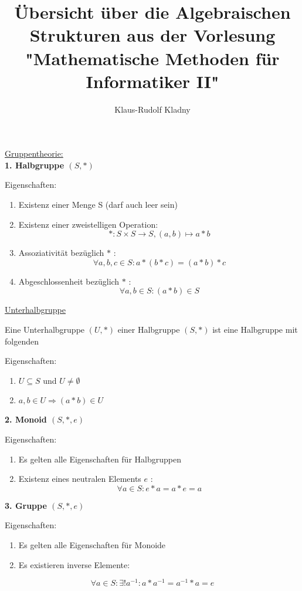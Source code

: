 \documentclass[18pt] {article}
\title{Übersicht über die Algebraischen Strukturen aus der Vorlesung "Mathematische Methoden für Informatiker II"}
\date{\vspace{-4ex}}
\author{Klaus-Rudolf Kladny}
\begin{document}
\maketitle
\vspace{15mm}
\underline{\huge Gruppentheorie:}\\

\textbf{1. Halbgruppe $(S, *)$}
\begin{framed}
Eigenschaften: \\
\begin{enumerate}
\item Existenz einer Menge S (darf auch leer sein)

\item Existenz einer zweistelligen Operation:\\
$$*: S \times S \rightarrow S, (a, b) \mapsto a * b$$

\item Assoziativität bezüglich $*$ :\\
$$\forall a, b, c \in S:   a*(b*c) = (a*b)*c$$

\item Abgeschlossenheit bezüglich $*$ :\\
$$\forall a, b \in S:   (a*b) \in S$$
\end{enumerate}
\end{framed} 
\bigskip
\large{\underline{Unterhalbgruppe}}

Eine Unterhalbgruppe $(U, *)$ einer Halbgruppe $(S, *)$ ist eine Halbgruppe mit folgenden 

Eigenschaften:\\

\begin{enumerate}
\item $U \subseteq S$ und $U \neq \emptyset$

\item $a, b \in U \Rightarrow (a * b) \in U$
\end{enumerate}
\pagebreak
\textbf{2. Monoid $(S, *, e)$}
\begin{framed}
Eigenschaften: \\

\begin{enumerate}
\item Es gelten alle Eigenschaften für Halbgruppen

\item Existenz eines neutralen Elements $e$ :
$$\forall a \in S :   e*a = a*e = a$$
\end{enumerate}
\end{framed} 
\bigskip
\textbf{3. Gruppe $(S, *, e)$}
\begin{framed}
Eigenschaften: \\

\begin{enumerate}
\item Es gelten alle Eigenschaften für Monoide

\item Es existieren inverse Elemente:
\end{enumerate}
$$ \forall a \in S :  \exists! a^{-1} : a * a^{-1} = a^{-1} * a = e $$
\end{framed} 
\end{document}
